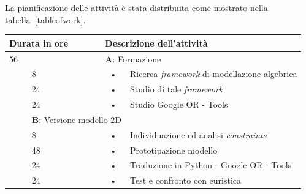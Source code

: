 La pianificazione delle attività è stata distribuita come mostrato nella tabella~\eqref{tableofwork}.
\begin{center}
	\begin{tabular}{|l|l|c l|}
		\hline
		\multicolumn{2}{|l|}{\textbf{Durata in ore}}		&	\multicolumn{2}{l|}{\textbf{Descrizione dell'attività}}\\
		\hline
		\multicolumn{2}{|l|}{56}	&	\multicolumn{2}{l|}{\textbf{A}: Formazione}\\
		\hline
		\multirow{5}{1cm}{ } & 8  & \hspace{5mm}•\hspace{2mm} & Ricerca \textit{framework} di modellazione algebrica \\
		\multirow{5}{1cm}{ } & 24 & \hspace{5mm}•\hspace{2mm} & Studio di tale \textit{framework}                    \\
		\multirow{5}{1cm}{ } & 24 & \hspace{5mm}•\hspace{2mm} & Studio Google OR - Tools                             \\
		\hline
																											
		\multicolumn{2}{|l|}{104}	&	\multicolumn{2}{l|}{\textbf{B}: Versione modello 2D}\\
		\hline
		\multirow{5}{1cm}{ } & 8  & \hspace{5mm}•\hspace{2mm} & Individuazione ed analisi \textit{constraints}       \\
		\multirow{3}{1cm}{ } & 48 & \hspace{5mm}•\hspace{2mm} & Prototipazione modello                               \\
		\multirow{5}{1cm}{ } & 24 & \hspace{5mm}•\hspace{2mm} & Traduzione in Python - Google OR - Tools             \\
		\multirow{5}{1cm}{ } & 24 & \hspace{5mm}•\hspace{2mm} & Test e confronto con euristica                       \\	
		\hline
																											

\end{tabular}
\end{center}

